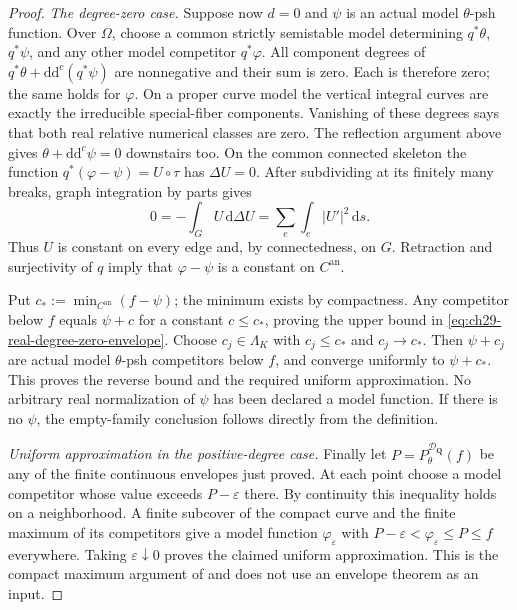 \begin{proof}
\emph{The degree-zero case.}
Suppose now $d=0$ and $\psi$ is an actual model $\theta$-psh function.
Over $\Omega$, choose a common strictly semistable model determining
$q^*\theta$, $q^*\psi$, and any other model competitor $q^*\varphi$.
All component degrees of
$q^*\theta+\mathrm d\mathrm d^c(q^*\psi)$ are nonnegative and their
sum is zero.  Each is therefore zero; the same holds for $\varphi$.
On a proper curve model the vertical integral curves are exactly the
irreducible special-fiber components.  Vanishing of these degrees says
that both real relative numerical classes are zero.
The reflection argument above gives
$\theta+\mathrm d\mathrm d^c\psi=0$ downstairs too.
On the common connected skeleton the function
$q^*(\varphi-\psi)=U\circ\tau$ has $\Delta U=0$.
After subdividing at its finitely many breaks, graph integration by parts
gives
\[
 0=-\int_G U\,\mathrm d\Delta U
   =\sum_e\int_e|U'|^2\,\mathrm ds.
\]
Thus $U$ is constant on every edge and, by connectedness, on $G$.
Retraction and surjectivity of $q$ imply that $\varphi-\psi$ is a
constant on $C^{\mathrm{an}}$.

Put $c_*:=\min_{C^{\mathrm{an}}}(f-\psi)$; the minimum exists by
compactness.  Any competitor below $f$ equals $\psi+c$ for a constant
$c\leq c_*$, proving the upper bound in
\eqref{eq:ch29-real-degree-zero-envelope}.
Choose $c_j\in\Lambda_K$ with $c_j\leq c_*$ and $c_j\to c_*$.
Then $\psi+c_j$ are actual model $\theta$-psh competitors below $f$,
and converge uniformly to $\psi+c_*$.  This proves the reverse bound
and the required uniform approximation.  No arbitrary real normalization
of $\psi$ has been declared a model function.  If there is no $\psi$,
the empty-family conclusion follows directly from the definition.

\emph{Uniform approximation in the positive-degree case.}
Finally let $P=P^{\mathcal D_{\mathbf Q}}_\theta(f)$ be any of the
finite continuous envelopes just proved.  At each point choose a model
competitor whose value exceeds $P-\varepsilon$ there.  By continuity this
inequality holds on a neighborhood.  A finite subcover of the compact
curve and the finite maximum of its competitors give a model function
$\varphi_\varepsilon$ with
$P-\varepsilon<\varphi_\varepsilon\leq P\leq f$ everywhere.
Taking $\varepsilon\downarrow0$ proves the claimed uniform
approximation.  This is the compact maximum argument of
\cite[Proposition~2.9(8)]{GJKM19} and does not use an envelope theorem
as an input.
\end{proof}

